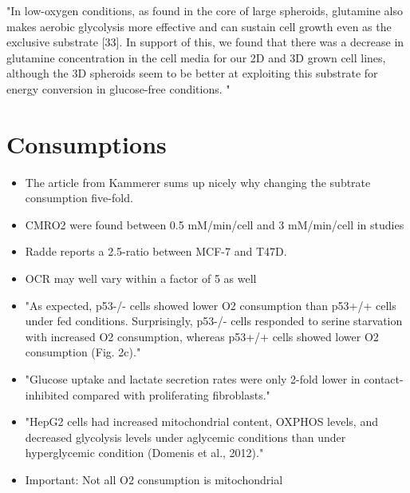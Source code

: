 \documentclass[11pt,a4paper]{article}
\begin{document}
\begin{itemize}
"In low-oxygen conditions, as found in the core of large spheroids, glutamine also makes aerobic glycolysis more effective and can sustain cell growth even as the exclusive substrate [33]. In support of this, we found that there was a decrease in glutamine concentration in the cell media for our 2D and 3D grown cell lines, although the 3D spheroids seem to be better at exploiting this substrate for energy conversion in glucose-free conditions. "\cite{Tidwell2022}
\end{itemize}

\section{Consumptions}
\begin{itemize}
\item The article from Kammerer sums up nicely why changing the subtrate consumption five-fold.

\item CMRO2 were found between 0.5 mM/min/cell and 3 mM/min/cell in studies \cite{Rhodes1983}\cite{Shalit1972}\cite{Kirsch1978}

\item Radde reports a 2.5-ratio between MCF-7 and T47D.

\item OCR may well vary within a factor of 5 as well 

\item "As expected, p53-/- cells showed lower O2 consumption than p53+/+ cells under fed conditions. Surprisingly, p53-/- cells responded to serine starvation with increased O2 consumption, whereas p53+/+ cells showed lower O2 consumption (Fig. 2c)."\cite{Maddocks2012}

\item "Glucose uptake and lactate secretion rates were only 2-fold lower in contact-inhibited compared with proliferating fibroblasts."\cite{Valcourt2012}

\item "HepG2 cells had increased mitochondrial content, OXPHOS levels, and decreased glycolysis levels under aglycemic conditions than under hyperglycemic condition (Domenis et al., 2012)."\cite{Zhang2023}

\item Important: Not all O2 consumption is mitochondrial


\end{itemize}
\end{document}
